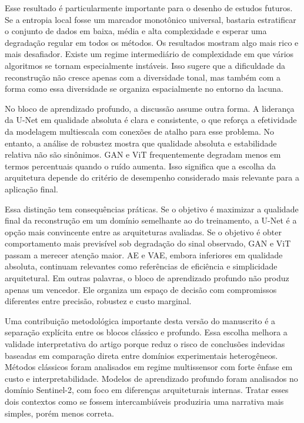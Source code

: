 Esse resultado é particularmente importante para o desenho de estudos futuros.
Se a entropia local fosse um marcador monotônico universal, bastaria estratificar o conjunto de dados em baixa, média e alta complexidade e esperar uma degradação regular em todos os métodos.
Os resultados mostram algo mais rico e mais desafiador.
Existe um regime intermediário de complexidade em que vários algoritmos se tornam especialmente instáveis.
Isso sugere que a dificuldade da reconstrução não cresce apenas com a diversidade tonal, mas também com a forma como essa diversidade se organiza espacialmente no entorno da lacuna.

No bloco de aprendizado profundo, a discussão assume outra forma.
A liderança da U-Net em qualidade absoluta é clara e consistente, o que reforça a efetividade da modelagem multiescala com conexões de atalho para esse problema.
No entanto, a análise de robustez mostra que qualidade absoluta e estabilidade relativa não são sinônimos.
\gls{GAN} e \gls{ViT} frequentemente degradam menos em termos percentuais quando o ruído aumenta.
Isso significa que a escolha da arquitetura depende do critério de desempenho considerado mais relevante para a aplicação final.

Essa distinção tem consequências práticas.
Se o objetivo é maximizar a qualidade final da reconstrução em um domínio semelhante ao do treinamento, a U-Net é a opção mais convincente entre as arquiteturas avaliadas.
Se o objetivo é obter comportamento mais previsível sob degradação do sinal observado, \gls{GAN} e \gls{ViT} passam a merecer atenção maior.
\gls{AE} e \gls{VAE}, embora inferiores em qualidade absoluta, continuam relevantes como referências de eficiência e simplicidade arquitetural.
Em outras palavras, o bloco de aprendizado profundo não produz apenas um vencedor.
Ele organiza um espaço de decisão com compromissos diferentes entre precisão, robustez e custo marginal.

Uma contribuição metodológica importante desta versão do manuscrito é a separação explícita entre os blocos clássico e profundo.
Essa escolha melhora a validade interpretativa do artigo porque reduz o risco de conclusões indevidas baseadas em comparação direta entre domínios experimentais heterogêneos.
Métodos clássicos foram analisados em regime multissensor com forte ênfase em custo e interpretabilidade.
Modelos de aprendizado profundo foram analisados no domínio Sentinel-2, com foco em diferenças arquiteturais internas.
Tratar esses dois contextos como se fossem intercambiáveis produziria uma narrativa mais simples, porém menos correta.

